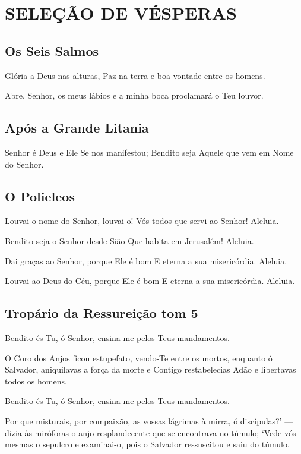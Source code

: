 \documentclass{subfiles}
\begin{document}
\chapter{SELEÇÃO DE VÉSPERAS}

\section*{Os Seis Salmos}

Glória a Deus nas alturas, Paz na terra e boa vontade entre os homens. \thrice{}

Abre, Senhor, os meus lábios e a minha boca proclamará o Teu louvor. 

\section*{Após a Grande Litania}

Senhor é Deus e Ele Se nos manifestou;
Bendito seja Aquele que vem em Nome do Senhor.


\section*{O Polieleos}

Louvai o nome do Senhor, louvai-o! Vós todos que servi ao Senhor! Aleluia.
\thrice{}

Bendito seja o Senhor desde Sião Que habita em Jerusalém! Aleluia. \thrice{}

Dai graças ao Senhor, porque Ele é bom E eterna a sua misericórdia. Aleluia.
\thrice{}

Louvai ao Deus do Céu, porque Ele é bom E eterna a sua misericórdia.
Aleluia. \thrice{}

\section*{Tropário da Ressureição tom 5}

Bendito és Tu, ó Senhor, ensina-me pelos Teus mandamentos.

O Coro dos Anjos ficou estupefato, vendo-Te entre os mortos, enquanto ó
Salvador, aniquilavas a força da morte e Contigo restabelecias Adão e libertavas
todos os homens.

Bendito és Tu, ó Senhor, ensina-me pelos Teus mandamentos.

Por que misturais, por compaixão, as vossas lágrimas à mirra, ó discípulas?’ —
dizia às miróforas o anjo resplandecente que se encontrava no túmulo; ‘Vede vós
mesmas o sepulcro e examinai-o, pois o Salvador ressuscitou e saiu do túmulo.
\end{document}
